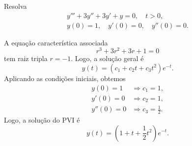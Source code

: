\begin{exeresol}\label{exeresol:edolin_on_h}
  Resolva
  \begin{align}
    y''' + 3y'' + 3y' + y = 0,\quad t>0,\\
    y(0)=1,\quad y'(0)=0,\quad y''(0)=0.
  \end{align}
\end{exeresol}
\begin{resol}
  A equação característica associada
  \begin{equation}
    r^3 + 3r^2 + 3r + 1 = 0
  \end{equation}
  tem raiz tripla $r=-1$. Logo, a solução geral é
  \begin{equation}
    y(t) = (c_1 + c_2t + c_3t^2)e^{-t}.
  \end{equation}
  Aplicando as condições iniciais, obtemos
  \begin{align}
    y(0) = 1 &\Rightarrow c_1 = 1,\\
    y'(0) = 0 &\Rightarrow c_2 = 1,\\
    y''(0) = 0 &\Rightarrow c_3 = \frac{1}{2}.
  \end{align}
  Logo, a solução do PVI é
  \begin{equation}
    y(t) = \left(1 + t + \frac{1}{2}t^2\right)e^{-t}.
  \end{equation}
\end{resol}


